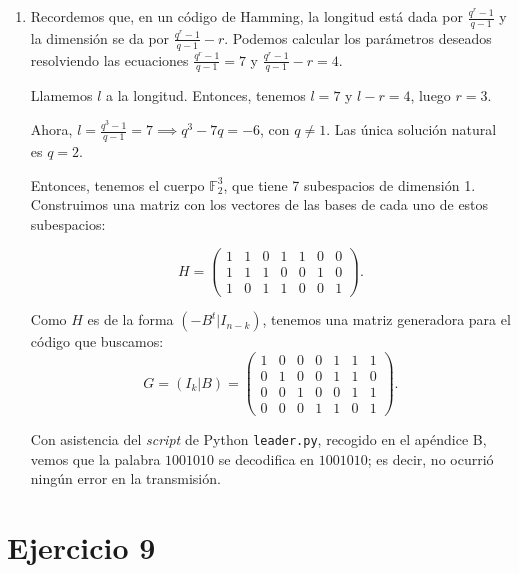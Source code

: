 \begin{enumerate}[label=\alph*)]
	\item Recordemos que, en un código de Hamming, la longitud está dada por $\frac{q^r-1}{q-1}$ y la dimensión se da por $\frac{q^r-1}{q-1}-r$. Podemos calcular los parámetros deseados resolviendo las ecuaciones $\frac{q^r-1}{q-1} = 7$ y $\frac{q^r-1}{q-1}-r = 4$.
	
	Llamemos $l$ a la longitud. Entonces, tenemos $l = 7$ y $l-r = 4$, luego $r = 3$.
	
	Ahora, $l = \frac{q^3-1}{q-1} = 7 \implies q^3 - 7q = -6$, con $q \neq 1$. Las única solución natural es $q = 2$.
	
	Entonces, tenemos el cuerpo $\mathbb{F}_2^3$, que tiene 7 subespacios de dimensión 1. Construimos una matriz con los vectores de las bases de cada uno de estos subespacios:
	
	\[H = \begin{pmatrix}
		1 & 1 & 0 & 1 & 1 & 0 & 0 \\
		1 & 1 & 1 & 0 & 0 & 1 & 0 \\
		1 & 0 & 1 & 1 & 0 & 0 & 1
	\end{pmatrix}.\]
	
	Como $H$ es de la forma $(-B^t|I_{n-k})$, tenemos una matriz generadora para el código que buscamos:
	\[G = (I_k|B) = \begin{pmatrix}
		1 & 0 & 0 & 0 & 1 & 1 & 1 \\
		0 & 1 & 0 & 0 & 1 & 1 & 0 \\
		0 & 0 & 1 & 0 & 0 & 1 & 1 \\
		0 & 0 & 0 & 1 & 1 & 0 & 1
	\end{pmatrix}.\]
	
	Con asistencia del \textit{script} de Python \texttt{leader.py}, recogido en el apéndice B, vemos que la palabra $1001010$ se decodifica en $1001010$; es decir, no ocurrió ningún error en la transmisión.
\end{enumerate}

\section{Ejercicio 9}

